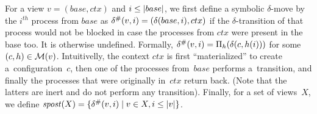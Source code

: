 For a view $v=(base,ctx)$ and $i\leq|base|$, we first define a
symbolic $\delta$-move by the $i^{th}$ process from $base$ as %
$\delta^\#(v,i) = (\delta(base,i),ctx)$ if the $\delta$-transition of
that process would not be blocked in case the processes from $ctx$
were present in the base too. %
It is otherwise undefined. %
%
Formally, $\delta^\#(v,i) = \Pi_{h}(\delta(c,h(i)))$ for some
$(c,h)\in{\mathcal{M}}(v)$.
%
Intuitivelly, the context $ctx$ is first ``materialized'' to create
a~configuration~$c$, then one of the processes from~$base$ performs
a~transition, and finally the processes that were originally in~$ctx$
return back. %
(Note that the latters are inert and do not perform any transition).
%
Finally, for a set of views~$X$, we define ${\mathit{spost}}(X) =
\{{\delta^\#(v,i)}\mathrel{}\mid\mathrel{}{v\in X,i\leq|v|}\}$.

%
%

